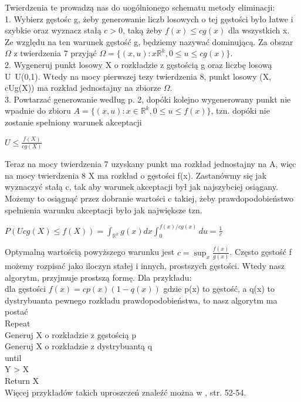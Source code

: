 \documentclass[a4paper]{scrartcl}
\begin{document}
Twierdzenia te prowadzą nas do uogólnionego schematu metody eliminacji:\\
1. Wybierz gęstośc g, żeby generowanie liczb losowych o tej gęstości było łatwe i szybkie oraz wyznacz stałą $c>0$, taką żeby $f(x)\leq cg(x)$ dla wszystkich x.\\
Ze względu na ten warunek gęstość g, będziemy nazywać dominującą. Za obszar $\Omega$ z twierdzenia 7 przyjąć $\Omega = \{(x,u):x \mathbb{R}^k, 0 \leq u \leq cg(x) \}$.\\
2. Wygeneruj punkt losowy X o rozkładzie z gęstością g oraz liczbę losową U~U(0,1). Wtedy na mocy pierwszej tezy twierdzenia 8, punkt losowy (X, cUg(X)) ma rozkład jednostajny na zbiorze $\Omega$.\\
3. Powtarzać generowanie według p. 2, dopóki kolejno wygenerowany punkt nie wpadnie do zbioru $A=\{(x,u):x \in \mathbb{R}^k, 0 \leq u \leq f(x)\}$, tzn. dopóki nie zostanie spełniony warunek akceptacji
\begin{center}
$U \leq \frac{f(X)}{cg(X)}$
\end{center}
Teraz na mocy twierdzenia 7 uzyskany punkt ma rozkład jednostajny na A, więc na mocy twierdzenia 8 X ma rozkład o gęstości f(x). Zastanówmy się jak wyznaczyć stałą c, tak aby warunek akceptacji był jak najszybciej osiągany. Możemy to osiągnąć przez dobranie wartości c takiej, żeby prawdopodobieństwo spełnienia warunku akceptacji było jak największe tzn.
\begin{center}
$P(Ucg(X) \leq f(X)) = \int_{\mathbb{R}^k}g(x)dx\int_0^{f(x)/cg(x)}du=\frac{1}{c}$
\end{center}
Optymalną wartością powyższego warunku jest $c=\sup_x\frac{f(x)}{g(x)}$.
Często gęstość f możemy rozpisać jako iloczyn stałej i innych, prostszych gęstości. Wtedy nasz algorytm, przyjmuje prostszą formę. Dla przykładu:\\
dla gęstości $f(x)=cp(x)(1-q(x))$ gdzie p(x) to gęstość, a q(x) to dystrybuanta pewnego rozkładu prawdopodobieństwa, to nasz algorytm ma postać\\
Repeat\\
\null\qquad Generuj X o rozkładzie z gęstością p\\
\null\qquad Generuj X o rozkładzie z dystrybuantą q\\
until\\
\null\qquad Y > X\\
Return X\\
Więcej przykładów takich uproszczeń znaleźć można w \cite{RNGZiel2}, str. 52-54.\\
\end{document}
